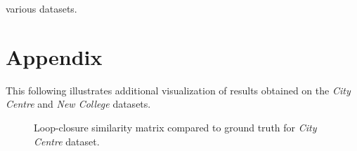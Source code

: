 \documentclass[10pt,twocolumn,letterpaper]{article}
\begin{document}
various datasets.



{\small


}

\section{Appendix}

This following illustrates additional visualization of results obtained on the \textit{City Centre} and \textit{New College} datasets.

\begin{figure}[H]
\centering
\caption{Loop-closure similarity matrix compared to ground truth for \textit{City Centre} dataset.}
\label{fig:city_centre_sim}
\end{figure}
\end{document}

